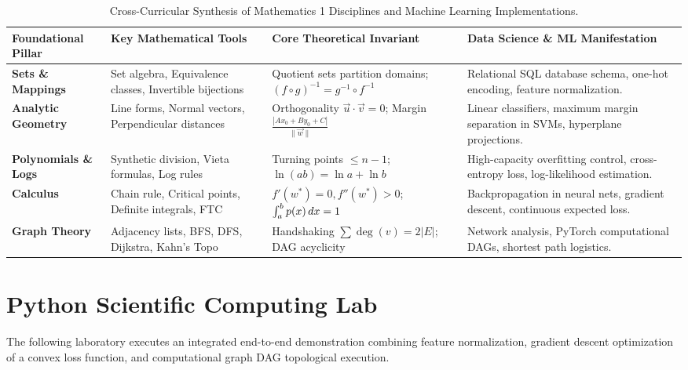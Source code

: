\begin{table}[htbp]
\centering
\small
\begin{tabular}{p{2.6cm} p{3.2cm} p{3.8cm} p{4.2cm}}
\toprule
\textbf{Foundational Pillar} & \textbf{Key Mathematical Tools} & \textbf{Core Theoretical Invariant} & \textbf{Data Science \& ML Manifestation} \\
\midrule
\textbf{Sets \& Mappings} & Set algebra, Equivalence classes, Invertible bijections & Quotient sets partition domains; $(f \circ g)^{-1} = g^{-1} \circ f^{-1}$ & Relational SQL database schema, one-hot encoding, feature normalization. \\
\addlinespace
\textbf{Analytic Geometry} & Line forms, Normal vectors, Perpendicular distances & Orthogonality $\vec{u} \cdot \vec{v} = 0$; Margin $\frac{|Ax_0+By_0+C|}{\|\vec{w}\|}$ & Linear classifiers, maximum margin separation in SVMs, hyperplane projections. \\
\addlinespace
\textbf{Polynomials \& Logs} & Synthetic division, Vieta formulas, Log rules & Turning points $\le n-1$; $\ln(ab) = \ln a + \ln b$ & High-capacity overfitting control, cross-entropy loss, log-likelihood estimation. \\
\addlinespace
\textbf{Calculus} & Chain rule, Critical points, Definite integrals, FTC & $f'(w^*) = 0, f''(w^*) > 0$; $\int_a^b p(x) \,dx = 1$ & Backpropagation in neural nets, gradient descent, continuous expected loss. \\
\addlinespace
\textbf{Graph Theory} & Adjacency lists, BFS, DFS, Dijkstra, Kahn's Topo & Handshaking $\sum \deg(v) = 2|E|$; DAG acyclicity & Network analysis, PyTorch computational DAGs, shortest path logistics. \\
\bottomrule
\end{tabular}
\caption{Cross-Curricular Synthesis of Mathematics 1 Disciplines and Machine Learning Implementations.}
\end{table}

\section{Python Scientific Computing Lab}

The following laboratory executes an integrated end-to-end demonstration combining feature normalization, gradient descent optimization of a convex loss function, and computational graph DAG topological execution.

